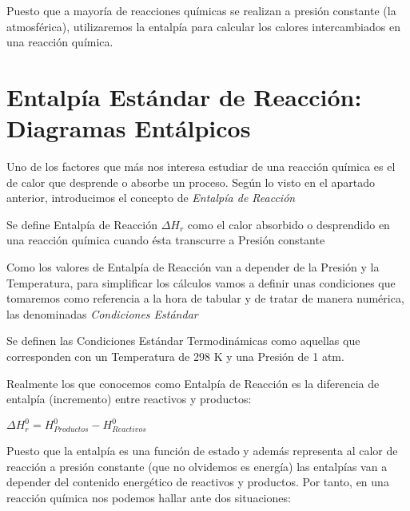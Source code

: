 Puesto que a mayoría de reacciones químicas se realizan a presión constante (la atmosférica), utilizaremos la entalpía para calcular los calores intercambiados en una reacción química.

\section{Entalpía Estándar de Reacción: Diagramas Entálpicos}

Uno de los factores que más nos interesa estudiar de una reacción química es el de calor que desprende o absorbe un proceso. Según lo visto en el apartado anterior, introducimos el concepto de \emph{Entalpía de Reacción}

\begin{definition}
	
	Se define Entalpía de Reacción $\Delta H_r$ como el calor absorbido o desprendido en una reacción química cuando ésta transcurre a Presión constante
	
\end{definition}

Como los valores de Entalpía de Reacción van a depender de la Presión y la Temperatura, para simplificar los cálculos vamos a definir unas condiciones que tomaremos como referencia a la hora de tabular y de tratar de manera numérica, las denominadas \emph{Condiciones Estándar}\\

\begin{definition}
	Se definen las Condiciones Estándar Termodinámicas como aquellas que corresponden con un Temperatura de 298 K y una Presión de 1 atm.
\end{definition}

Realmente los que conocemos como Entalpía de Reacción es la diferencia de entalpía (incremento) entre reactivos y productos:

\begin{center}
	$\Delta H^{0}_r = H^{0}_{Productos} -  H^{0}_{Reactivos} $
\end{center}

Puesto que la entalpía es una función de estado y además representa al calor de reacción a presión constante (que no olvidemos es energía) las entalpías van a depender del contenido energético de reactivos y productos. Por tanto, en una reacción química nos podemos hallar ante dos situaciones:\\

